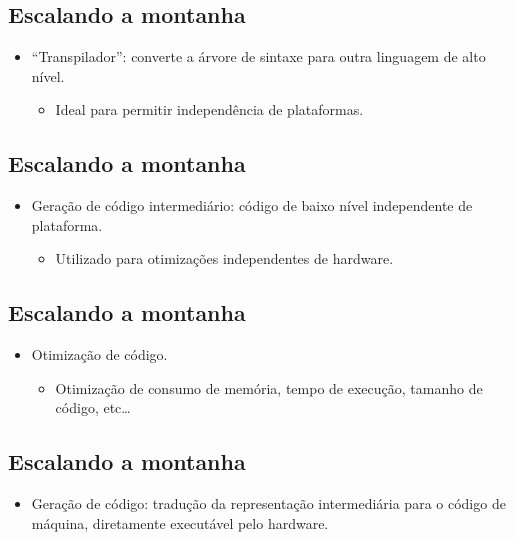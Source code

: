 \documentclass[11pt]{article}
\begin{document}
\subsection*{Escalando a montanha}
\label{sec:orgd5f190f}

\begin{itemize}
\item ``Transpilador'': converte a árvore de sintaxe para outra linguagem de alto nível.
\begin{itemize}
\item Ideal para permitir independência de plataformas.
\end{itemize}
\end{itemize}
\subsection*{Escalando a montanha}
\label{sec:org78c11f3}

\begin{itemize}
\item Geração de código intermediário: código de baixo nível independente de plataforma.
\begin{itemize}
\item Utilizado para otimizações independentes de hardware.
\end{itemize}
\end{itemize}
\subsection*{Escalando a montanha}
\label{sec:orge130930}

\begin{itemize}
\item Otimização de código.
\begin{itemize}
\item Otimização de consumo de memória, tempo de execução, tamanho de código, etc\ldots{}
\end{itemize}
\end{itemize}
\subsection*{Escalando a montanha}
\label{sec:orge753133}

\begin{itemize}
\item Geração de código: tradução da representação intermediária para o código de máquina,
diretamente executável pelo hardware.
\end{itemize}
\end{document}
